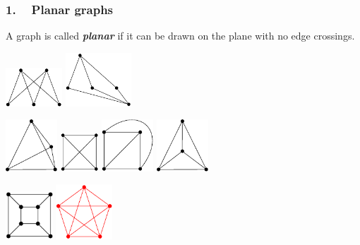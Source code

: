 \begin{frame}
\frametitle{1. ~ Planar graphs}


\bigskip

A graph is called \emph{\bfseries planar} if it can be drawn on the plane with no edge crossings.

\medskip \pause
\begin{center}
\includegraphics[width=60pt]{images/image-115.pdf} \hspace{30pt}
\includegraphics[width=70pt]{images/image-116.pdf}
\end{center}

\medskip \pause
\begin{center}
\includegraphics[width=55pt]{images/image-118-tetra.pdf} \hspace{20pt}
\includegraphics[width=40pt]{images/image-117.pdf} \hspace{20pt}
\includegraphics[width=55pt]{images/image-118.pdf} \hspace{20pt}
\includegraphics[width=55pt]{images/image-118-tetra2.pdf}
\end{center}

\medskip \pause
\begin{center}
\includegraphics[width=50pt]{images/image-124.pdf} \hspace{30pt} \pause
\includegraphics[width=60pt]{images/image-122-red.pdf}
\end{center}


\end{frame}
